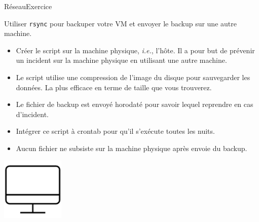 \documentclass{beamer}
\begin{document}
    \begin{frame}{Réseau}{Exercice \execcounterdispinc}
        \begin{footnotesize}
            Utiliser \lstinline{rsync} pour backuper votre VM et envoyer le backup sur une autre machine.
            \begin{itemize}
                \item Créer le script sur la machine physique, \textit{i.e.}, l'hôte.
                Il a pour but de prévenir un incident sur la machine physique en utilisant une autre machine.
                \item Le script utilise une compression de l'image du disque pour sauvegarder les données.
                La plus efficace en terme de taille que vous trouverez.
                \item Le fichier de backup est envoyé horodaté pour savoir lequel reprendre en cas d'incident.
                \item Intégrer ce script à crontab pour qu'il s'exécute toutes les nuits.
                \item Aucun fichier ne subsiste sur la machine physique après envoie du backup.
            \end{itemize}
        \end{footnotesize}
        \begin{center}
            \includegraphics[width=3cm]{image/desktop}
        \end{center}
    \end{frame}
\end{document}
